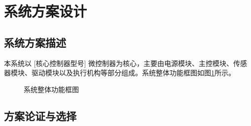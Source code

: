 \documentclass{ctexart}
\begin{document}
\begin{abstract}
    \noindent
    [ 此处填写摘要内容... ]

    \vspace{1cm}
    \noindent
    \textbf{关键词：} [关键词一]；[关键词二]；[关键词三]；[关键词四] %
\end{abstract}

\newpage
\tableofcontents
\newpage


\section{系统方案设计}
\subsection{系统方案描述}
    本系统以 [核心控制器型号] 微控制器为核心，主要由电源模块、主控模块、传感器模块、驱动模块以及执行机构等部分组成。系统整体功能框图如图\ref{fig:system_block}所示。
    
\begin{figure}[H]
	\centering
	\caption{系统整体功能框图}
	\label{fig:system_block}
\end{figure}

\subsection{方案论证与选择}
\end{document}
